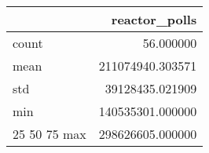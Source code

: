 \begin{tabular}{lr}
\toprule
 & reactor\_polls \\
\midrule
count & 56.000000 \\
mean & 211074940.303571 \\
std & 39128435.021909 \\
min & 140535301.000000 \\
25%
50%
75%
max & 298626605.000000 \\
\bottomrule
\end{tabular}

